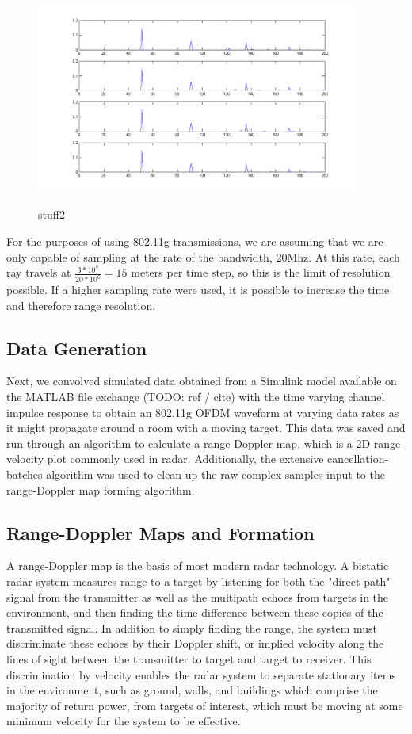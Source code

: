 \documentclass[article,11pt,onecolumn,final]{IEEEtran}
\begin{document}
\begin{figure}
\caption{stuff2}
\centering
\includegraphics[width=400px]{sim/impulse_response_taps.png}  
\label{fig:stuff2}
\end{figure}



For the purposes of using 802.11g transmissions, we are assuming that we are only capable of sampling at the rate of the bandwidth, 20Mhz. At this rate, each ray travels at $\frac{3*10^8}{20*10^6} = 15$ meters per time step, so this is the limit of resolution possible. If a higher sampling rate were used, it is possible to increase the time and therefore range resolution.

\subsection{Data Generation}
Next, we convolved simulated data obtained from a Simulink model available on the MATLAB file exchange (TODO: ref / cite) with the time varying channel impulse response to obtain an 802.11g OFDM waveform at varying data rates as it might propagate around a room with a moving target. This data was saved and run through an algorithm to calculate a range-Doppler map, which is a 2D range-velocity plot commonly used in radar. Additionally, the extensive cancellation-batches algorithm was used to clean up the raw complex samples input to the range-Doppler map forming algorithm.

\subsection{Range-Doppler Maps and Formation}

A range-Doppler map is the basis of most modern radar technology. A bistatic radar system measures range to a target by listening for both the "direct path" signal from the transmitter as well as the multipath echoes from targets in the environment, and then finding the time difference between these copies of the transmitted signal. In addition to simply finding the range, the system must discriminate these echoes by their Doppler shift, or implied velocity along the lines of sight between the transmitter to target and target to receiver. This discrimination by velocity enables the radar system to separate stationary items in the environment, such as ground, walls, and buildings which comprise the majority of return power, from targets of interest, which must be moving at some minimum velocity for the system to be effective.
\end{document}

